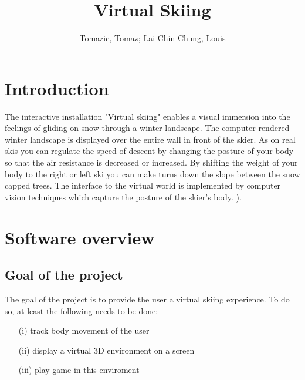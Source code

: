 \documentclass[fonts]{icst}
\begin{document}

\title{Virtual Skiing}

\author{Tomazic, Tomaz; Lai Chin Chung, Louis}

\address{University of Ljubljana, Faculty of informatics and computer science}




\maketitle

\section{Introduction}
The interactive installation "Virtual skiing" enables a visual immersion into the feelings of gliding on snow through a winter landscape. The computer rendered winter landscape is displayed over the entire wall in front of the skier. As on real skis you can regulate the speed of descent by changing the posture of your body so that the air resistance is decreased or increased. By shifting the weight of your body to the right or left ski you can make turns down the slope between the snow capped trees. The interface to the virtual world is implemented by computer vision techniques which capture the posture of the skier's body. \cite{ORIG}).

\section{Software overview}
\subsection{Goal of the project}
The goal of the project is to provide the user a virtual skiing experience. To do so, at least the following needs to be done:
\begin{enumerate}
\item[(i)] track body movement of the user
\item[(ii)] display a virtual 3D environment on a screen
\item[(iii)] play game in this enviroment
\end{enumerate}
\end{document}
